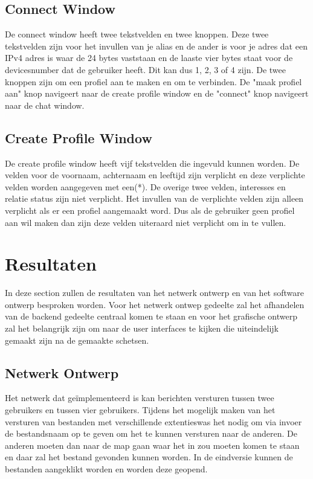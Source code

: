 \documentclass[12pt]{article}
\begin{document}
\subsection*{Connect Window}
\label{connectie}
De connect window heeft twee tekstvelden en twee knoppen. Deze twee tekstvelden zijn voor het invullen van je alias en de ander is voor je adres dat een IPv4 adres is waar de 24 bytes vaststaan en de laaste vier bytes staat voor de devicesnumber dat de gebruiker heeft. Dit kan dus 1, 2, 3 of 4 zijn. De twee knoppen zijn om een profiel aan te maken en om te verbinden. De "maak profiel aan" knop navigeert naar de create profile window en de "connect" knop navigeert naar de chat window.

\subsection*{Create Profile Window}
\label{CPW}
De create profile window heeft vijf tekstvelden die ingevuld kunnen worden. De velden voor de voornaam, achternaam en leeftijd zijn verplicht en deze verplichte velden worden aangegeven met een(*). De overige twee velden, interesses en relatie status zijn niet verplicht. Het invullen van de verplichte velden zijn alleen verplicht als er een profiel aangemaakt word. Dus als de gebruiker geen profiel aan wil maken dan zijn deze velden uiteraard niet verplicht om in te vullen. 
\newpage

\section{Resultaten}
In deze section zullen de resultaten van het netwerk ontwerp en van het software ontwerp besproken worden. Voor het netwerk ontwep gedeelte zal het afhandelen van de backend gedeelte centraal komen te staan en voor het grafische ontwerp zal het belangrijk zijn om naar de user interfaces te kijken die uiteindelijk gemaakt zijn na de gemaakte schetsen. 

\subsection{Netwerk Ontwerp}
Het netwerk dat ge\"implementeerd is kan berichten versturen tussen twee gebruikers en tussen vier gebruikers. Tijdens het mogelijk maken van het versturen van bestanden met verschillende extentieswas het nodig om via invoer de bestandsnaam op te geven om het te kunnen versturen naar de anderen. De anderen moeten dan naar de map gaan waar het in zou moeten komen te staan en daar zal het bestand gevonden kunnen worden. In de eindversie kunnen de bestanden aangeklikt worden en worden deze geopend.
\end{document}
